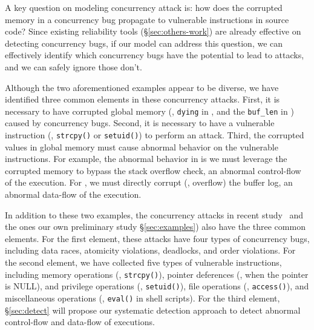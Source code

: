 A key question on modeling concurrency attack is: how does the corrupted memory 
in a concurrency bug propagate to vulnerable instructions in source code? Since 
existing reliability tools (\S\ref{sec:others-work}) are already effective on 
detecting concurrency bugs, if our model can address this question, we can 
effectively identify which concurrency bugs have the potential to lead to 
attacks, and we can safely ignore those don't.

Although the two aforementioned examples appear to be diverse, we have 
identified three common elements in these concurrency attacks. First, it is 
necessary to have corrupted global memory (\eg, \texttt{dying} in \libsafe, and 
the \texttt{buf\_len} in \apache) caused by concurrency bugs. Second, it is 
necessary to have a vulnerable instruction (\eg, \texttt{strcpy()} or 
\texttt{setuid()}) to perform an attack. Third, the corrupted values in global 
memory must cause abnormal behavior on the vulnerable instructions. For 
example, the abnormal behavior in \libsafe is we must leverage the corrupted 
memory to bypass the stack overflow check, an abnormal control-flow of the 
execution. For \apache, we must directly corrupt (\ie, overflow) the buffer 
log, an abnormal data-flow of the execution.

% 
In addition to these two examples, the \nattacks concurrency attacks in recent 
study~\cite{con:hotpar12} and the \noldattacks ones our own preliminary study 
\S\ref{sec:examples}) also have the three common elements. For the first 
element, these attacks have four types of concurrency bugs, including data 
races, atomicity violations, deadlocks, and order violations. For the second 
element, we have collected five types of vulnerable instructions, including 
memory operations (\eg, \texttt{strcpy()}), pointer deferences (\eg, when the 
pointer is NULL), and privilege operations (\eg, \texttt{setuid()}), file 
operations (\eg, \texttt{access()}), and miscellaneous operations (\eg, 
\texttt{eval()} in shell scripts). For the third element, \S\ref{sec:detect} 
will propose our systematic detection approach to detect abnormal control-flow 
and data-flow of executions.

